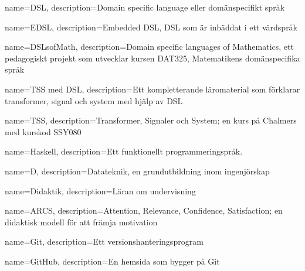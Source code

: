 {
    name=DSL,
    description={Domain specific language eller domänspecifikt språk}
}

{
    name=EDSL,
    description={Embedded DSL, DSL som är inbäddat i ett värdspråk}
}

{
    name=DSLsofMath,
    description={Domain specific languages of Mathematics, ett pedagogiskt projekt som utvecklar kursen DAT325, Matematikens domänspecifika språk}
}

{
    name={TSS med DSL},
    description={Ett kompletterande läromaterial som förklarar transformer, signal och system med hjälp av DSL}
}


{
    name=TSS,
    description={Transformer, Signaler och System; en kurs på Chalmers med kurskod SSY080}
}

{
	name=Haskell,
	description={Ett funktionellt programmeringspråk.}
}

{
    name=D,
    description={Datateknik, en grundutbildning inom ingenjörskap}
}

{
    name=Didaktik,
    description={Läran om undervisning}
}

{
    name=ARCS,
    description={Attention, Relevance, Confidence, Satisfaction; en didaktisk modell för att främja motivation}
}

{
    name=Git,
    description={Ett versionshanteringsprogram}
}

{
    name=GitHub,
    description={En hemsida som bygger på Git}
}